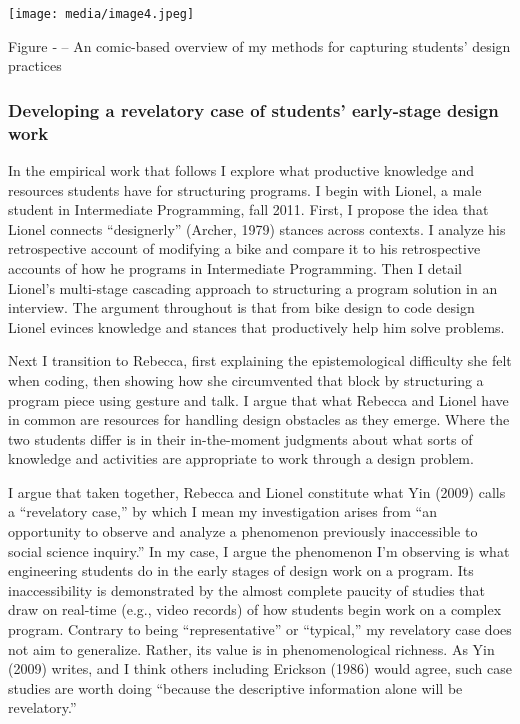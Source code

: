 \texttt{[image: media/image4.jpeg]}

\protect\hypertarget{ux5fToc252445967}{}{}Figure ‑ -- An comic-based
overview of my methods for capturing students' design practices

\subsubsection{Developing a revelatory case of students' early-stage
design
work}\label{developing-a-revelatory-case-of-students-early-stage-design-work}

In the empirical work that follows I explore what productive knowledge
and resources students have for structuring programs. I begin with
Lionel, a male student in Intermediate Programming, fall 2011. First, I
propose the idea that Lionel connects ``designerly'' (Archer, 1979)
stances across contexts. I analyze his retrospective account of
modifying a bike and compare it to his retrospective accounts of how he
programs in Intermediate Programming. Then I detail Lionel's multi-stage
cascading approach to structuring a program solution in an interview.
The argument throughout is that from bike design to code design Lionel
evinces knowledge and stances that productively help him solve problems.

Next I transition to Rebecca, first explaining the epistemological
difficulty she felt when coding, then showing how she circumvented that
block by structuring a program piece using gesture and talk. I argue
that what Rebecca and Lionel have in common are resources for handling
design obstacles as they emerge. Where the two students differ is in
their in-the-moment judgments about what sorts of knowledge and
activities are appropriate to work through a design problem.

I argue that taken together, Rebecca and Lionel constitute what Yin
(2009) calls a ``revelatory case,'' by which I mean my investigation
arises from ``an opportunity to observe and analyze a phenomenon
previously inaccessible to social science inquiry.'' In my case, I argue
the phenomenon I'm observing is what engineering students do in the
early stages of design work on a program. Its inaccessibility is
demonstrated by the almost complete paucity of studies that draw on
real-time (e.g., video records) of how students begin work on a complex
program. Contrary to being ``representative'' or ``typical,'' my
revelatory case does not aim to generalize. Rather, its value is in
phenomenological richness. As Yin (2009) writes, and I think others
including Erickson (1986) would agree, such case studies are worth doing
``because the descriptive information alone will be revelatory.''

